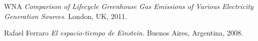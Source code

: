 \documentclass[11pt,a4paper]{article}
\author{Ignacio Perez Laborda}
\begin{document}


\tableofcontents

\listoffigures

\newpage

\newpage
\begin{thebibliography}{9}

  WNA
  \emph{Comparison of Lifecycle Greenhouse Gas Emissions of Various Electricity Generation Sources}.
  London, UK,
  2011.

  Rafael Ferraro
  \emph{El espacio-tiempo de Einstein.}
  Buenos Aires, Argentina,
  2008.
		
\end{thebibliography}
\end{document}
